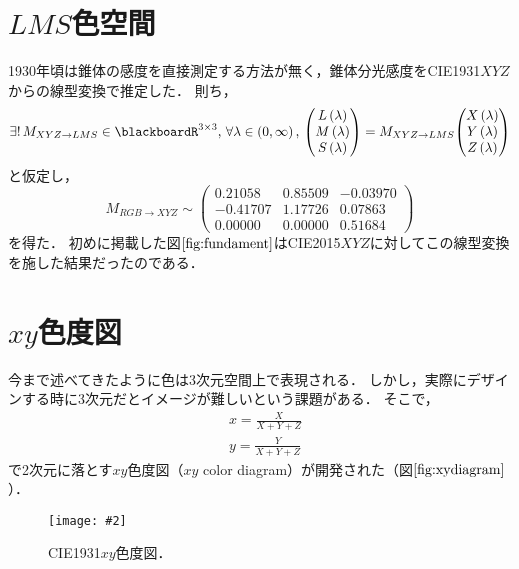 \documentclass[uplatex,paper=a4,fontsize=4.0truemm,jafontsize=4.0truemm,head_space=30.0truemm,foot_space=30.0truemm,baselineskip=8.0truemm,line_length=40zw,gutter=25.0truemm,oneside,openany,fleqn,hanging_panctuation,open_bracket_pos=nibu_tentsuki,dvipdfmx,jis2004,book,titlepage]{jlreq}
\theoremstyle{mystyle}
\newcommand{\captiondot}[1]{\caption{#1．}}
\newcommand{\figureinput}[4]{\begin{figure}[btp]\centering\texttt{[image: \#2]}\captiondot{#3}\label{fig:#4}\end{figure}}
\newcommand{\mathdisplaystyle}[1]{\(\displaystyle{#1}\)}
\newcommand{\Reference}[1]{\mathdisplaystyle{\ref{#1}}}
\newcommand{\negativevalue}[1]{{-#1}}
\newcommand{\fraction}[2]{\displaystyle{\frac{\displaystyle{#1}}{\displaystyle{#2}}}}
\newcommand{\mathcomma}{\mathpunct{,\,}}
\newcommand{\parentheses}[1]{\left(#1\right)}
\newcommand{\easymatrix}[1]{\mathord{\begin{pmatrix}#1\end{pmatrix}}}
\begin{document}
		\section{\mathdisplaystyle{LMS}色空間}
			1930年頃は錐体の感度を直接測定する方法が無く，錐体分光感度をCIE1931\mathdisplaystyle{XYZ}からの線型変換で推定した．
			則ち，
			\begin{equation*}
				\exists!\,{M_{XYZ\to LMS}\in\blackboardR^{3\times3}}\mathcomma\forall\lambda\in\parentheses{0,\infty}\mathcomma\easymatrix{L\parentheses{\lambda} \\ M\parentheses{\lambda} \\ S\parentheses{\lambda}}=M_{XYZ\to LMS}\easymatrix{X\parentheses{\lambda} \\ Y\parentheses{\lambda} \\ Z\parentheses{\lambda}}
			\end{equation*}
			と仮定し，
			\begin{equation*}
				M_{RGB\to XYZ}\sim\easymatrix{0.21058 & 0.85509 & \negativevalue{0.03970} \\ \negativevalue{0.41707} & 1.17726 & 0.07863 \\ 0.00000 & 0.00000 & 0.51684}
			\end{equation*}
			を得た．
			初めに掲載した図\Reference{fig:fundament}はCIE2015\mathdisplaystyle{XYZ}に対してこの線型変換を施した結果だったのである．
		\section{\mathdisplaystyle{xy}色度図}
			今まで述べてきたように色は3次元空間上で表現される．
			しかし，実際にデザインする時に3次元だとイメージが難しいという課題がある．
			そこで，\begin{align*}
				&x=\fraction{X}{X+Y+Z}\\
				&y=\fraction{Y}{X+Y+Z}
			\end{align*}
			で2次元に落とす\mathdisplaystyle{xy}色度図（\mathdisplaystyle{xy} color diagram）が開発された（図\Reference{fig:xydiagram}）．
			\figureinput{width=\linewidth}{D:/a/figs/xy.png}{CIE1931\mathdisplaystyle{xy}色度図}{xydiagram}
\end{document}
